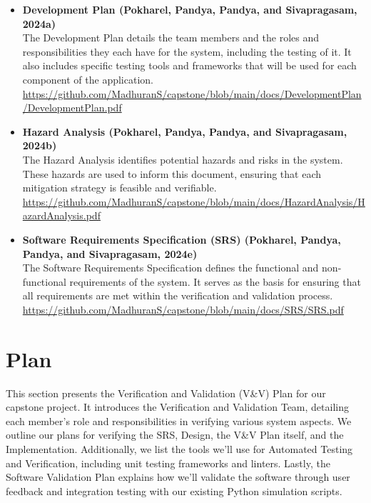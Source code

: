 \documentclass[12pt, titlepage]{article}
\begin{document}
\begin{itemize}
    \item \textbf{Development Plan (Pokharel, Pandya, Pandya, and Sivapragasam, 2024a)} \\
    The Development Plan details the team members and the roles and responsibilities they each have for the system, including the testing of it. It also includes specific testing tools and frameworks that will be used for each component of the application. \\[1em]
    \url{https://github.com/MadhuranS/capstone/blob/main/docs/DevelopmentPlan/DevelopmentPlan.pdf}
    
    \item \textbf{Hazard Analysis (Pokharel, Pandya, Pandya, and Sivapragasam, 2024b)} \\
    The Hazard Analysis identifies potential hazards and risks in the system. These hazards are used to inform this document, ensuring that each mitigation strategy is feasible and verifiable. \\[1em]
    \url{https://github.com/MadhuranS/capstone/blob/main/docs/HazardAnalysis/HazardAnalysis.pdf}

    
    \item \textbf{Software Requirements Specification (SRS) (Pokharel, Pandya, Pandya, and Sivapragasam, 2024e)} \\
    The Software Requirements Specification defines the functional and non-functional requirements of the system. It serves as the basis for ensuring that all requirements are met within the verification and validation process. \\[1em]
    \url{https://github.com/MadhuranS/capstone/blob/main/docs/SRS/SRS.pdf}
\end{itemize}




\section{Plan}

This section presents the Verification and Validation (V\&V) Plan for our capstone project. It introduces the Verification and Validation Team, detailing each member’s role and responsibilities in verifying various system aspects. We outline our plans for verifying the SRS, Design, the V\&V Plan itself, and the Implementation. Additionally, we list the tools we’ll use for Automated Testing and Verification, including unit testing frameworks and linters. Lastly, the Software Validation Plan explains how we’ll validate the software through user feedback and integration testing with our existing Python simulation scripts.
\end{document}
